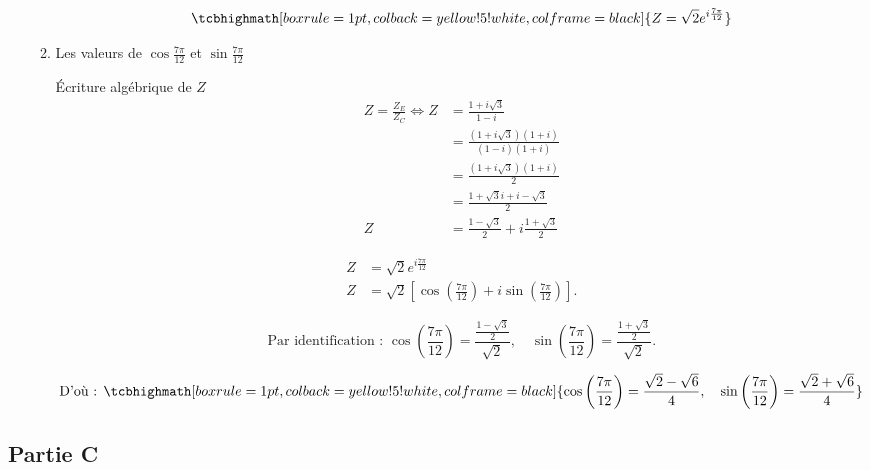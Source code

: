 \documentclass[12pt,a4paper]{article}
\begin{document}
\begin{enumerate}
\begin{enumerate}
\[
\tcbhighmath[boxrule=1pt, colback=yellow!5!white, colframe=black]{ Z = \sqrt{2} e^{i\frac{7\pi}{12}} }
\]
\item Les valeurs de $\cos\frac{7\pi}{12}$ et $\sin\frac{7\pi}{12}$

Écriture algébrique de $Z$
\begin{align*}
Z = \frac{Z_E}{Z_C}\iff Z &= \frac{1 + i\sqrt{3}}{1 - i}\\
  &= \frac{(1 + i\sqrt{3})(1 + i)}{(1 - i)(1 + i)}\\
 &= \frac{(1 + i\sqrt{3})(1 + i)}{2}\\
 &= \frac{1 + \sqrt{3}i + i - \sqrt{3}}{2}\\
Z &= \frac{1 - \sqrt{3}}{2} + i \frac{1 + \sqrt{3}}{2}
\end{align*}

\begin{align*}
Z &= \sqrt{2} e^{i\frac{7\pi}{12}}\\
Z &= \sqrt{2} \left[\cos\left(\frac{7\pi}{12}\right) + i\sin\left(\frac{7\pi}{12}\right)\right].
\end{align*}

\[
\text{Par identification : }\cos\left(\frac{7\pi}{12}\right) = \frac{\frac{1 - \sqrt{3}}{2}}{\sqrt{2}}, \quad \sin\left(\frac{7\pi}{12}\right) = \frac{\frac{1 + \sqrt{3}}{2}}{\sqrt{2}}.
\]

\[ \text{D'où : }
\tcbhighmath[boxrule=1pt, colback=yellow!5!white, colframe=black]{ \cos\left(\frac{7\pi}{12}\right) = \frac{\sqrt{2} - \sqrt{6}}{4}, \quad \sin\left(\frac{7\pi}{12}\right) = \frac{\sqrt{2} + \sqrt{6}}{4} }
\]
\end{enumerate}

\end{enumerate}
\subsection*{ Partie C}
\end{document}
